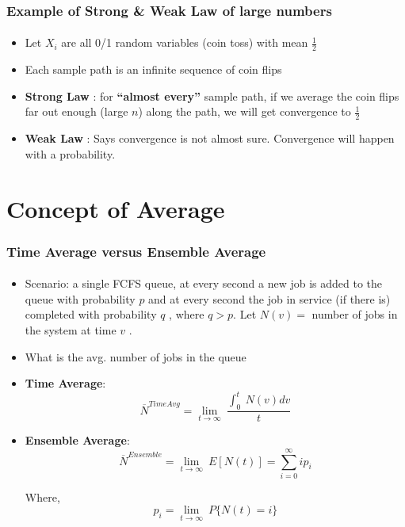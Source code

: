 \documentclass{beamer}
\begin{document}
\begin{frame}
\frametitle{Example of Strong \& Weak Law of large numbers}
\framesubtitle{\textbf{\textit{}}}
\begin{itemize}
\item Let $X_i$ are all 0/1 random variables (coin toss) with mean $\frac{1}{2}$
\item Each sample path is an infinite sequence of coin flips

\item \textbf{Strong Law} : for \textbf{“almost every”} sample path, if we average the coin flips far out enough (large $n$) along the path, we will get convergence to $\frac{1}{2}$

\item \textbf{Weak Law} : Says convergence is not almost sure. Convergence will happen with a probability. 
	
\end{itemize}	    
    
\end{frame}

\section{Concept of Average}

\begin{frame}
\frametitle{Time Average versus Ensemble Average}
\framesubtitle{\textbf{\textit{}}}
\begin{itemize}
\item Scenario: a single FCFS queue,  at every second a new job is
added to the queue with probability $p$ and at every second the job in service (if there is) completed with probability $q$ , where $q > p$. Let $N (v) =$ number of jobs in the system at time $v$ . 

\item What is the avg. number  of jobs in the queue

\item  \textbf{Time Average}: $$\overline{N}^{Time Avg} = \lim_{t \rightarrow \infty} \: \frac{\int_0^t \: N(v)dv}{t}$$

\item  \textbf{Ensemble Average}: $$\overline{N}^{Ensemble} = \lim_{t \rightarrow \infty} \: E[N(t)] = {\sum^{\infty}_{i=0}} ip_i$$

Where, 
$$p_i = \lim_{t \rightarrow \infty} \: P\{ N(t) = i \}$$

	
\end{itemize}	    
    
\end{frame}
\end{document}
